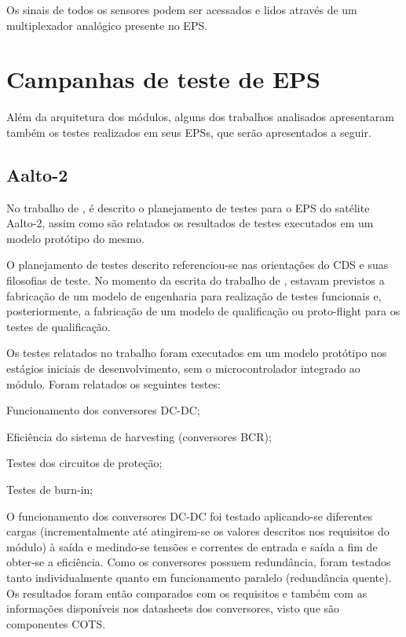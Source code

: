 Os sinais de todos os sensores podem ser acessados e lidos através de um multiplexador analógico presente no \gls{EPS}.





\section{Campanhas de teste de EPS}\label{sec:testes-epss}

Além da arquitetura dos módulos, alguns dos trabalhos analisados apresentaram também os testes realizados em seus \gls{EPS}s, que serão apresentados a seguir.

\subsection{Aalto-2}

No trabalho de \textcite{aalto-eps}, é descrito o planejamento de testes para o EPS do satélite Aalto-2, assim como são relatados os resultados de testes executados em um modelo protótipo do mesmo.

O planejamento de testes descrito referenciou-se nas orientações do \gls{CDS} e suas filosofias de teste.
No momento da escrita do trabalho de \textcite{aalto-eps}, estavam previstos a fabricação de um modelo de engenharia para realização de testes funcionais e, posteriormente, a fabricação de um modelo de qualificação ou proto-flight para os testes de qualificação.

Os testes relatados no trabalho foram executados em um modelo protótipo nos estágios iniciais de desenvolvimento, sem o microcontrolador integrado ao módulo. Foram relatados os seguintes testes:

\begin{alineas}
    \item Funcionamento dos conversores DC-DC;
    \item Eficiência do sistema de harvesting (conversores \gls{BCR});
    \item Testes dos circuitos de proteção;
    \item Testes de burn-in;
\end{alineas} 

O funcionamento dos conversores DC-DC foi testado aplicando-se diferentes cargas (incrementalmente até atingirem-se os valores descritos nos requisitos do módulo) à saída e medindo-se tensões e correntes de entrada e saída a fim de obter-se a eficiência. Como os conversores possuem redundância, foram testados tanto individualmente quanto em funcionamento paralelo (redundância quente).
Os resultados foram então comparados com os requisitos e também com as informações disponíveis nos datasheets dos conversores, visto que são componentes \gls{COTS}.

